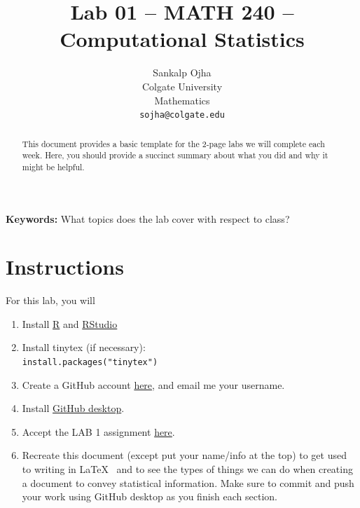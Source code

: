 \documentclass{article}\usepackage[]{graphicx}\usepackage[]{xcolor}
\begin{document}
\vspace{-1in}
\title{Lab 01 -- MATH 240 -- Computational Statistics}

\author{
  Sankalp Ojha \\
  Colgate University  \\
  Mathematics  \\
  {\tt sojha@colgate.edu}
}

\date{}

\maketitle

\begin{multicols}{2}
\begin{abstract}
This document provides a basic template for the 2-page labs we will complete each week. Here, you should provide a succinct summary about what you did and why it might be helpful.
\end{abstract}

\textbf{Keywords:} What topics does the lab cover with respect to class?

\section{Instructions}

For this lab, you will

\begin{enumerate}[1.]\itemsep0em
\item Install \href{https://cran.rstudio.com/}{R} and \href{https://posit.co/download/rstudio-desktop/}{RStudio}
\item Install tinytex (if necessary): \\
     {\tt install.packages("tinytex")}
\item Create a GitHub account \href{https://github.com/}{here}, and email me your username.
\item Install \href{https://github.com/apps/desktop}{GitHub desktop}.
\item Accept the LAB 1 assignment \href{https://classroom.github.com/assignment-invitations/49ec7c38806e92bfef8bf3094b9b11d3}{here}.
\item Recreate this document (except put your name/info at the top) to get used to writing in \LaTeX~ and to see the types of things we can do when creating a document to convey statistical information. Make sure to commit and push your work using GitHub desktop as you finish each section.
\end{enumerate}


\end{multicols}
\end{document}
